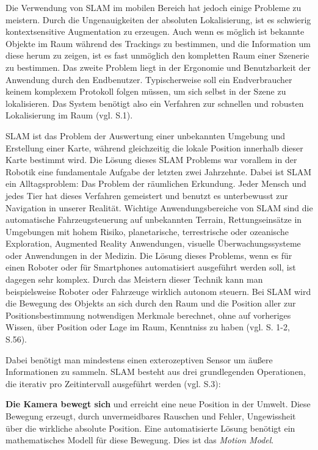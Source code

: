 Die Verwendung von SLAM im mobilen Bereich hat jedoch einige Probleme zu meistern. Durch die Ungenauigkeiten der absoluten Lokalisierung, ist es schwierig kontextsensitive Augmentation zu erzeugen. Auch wenn es möglich ist bekannte Objekte im Raum während des Trackings zu bestimmen, und die Information um diese herum zu zeigen, ist es fast unmöglich den kompletten Raum einer Szenerie zu bestimmen. Das zweite Problem liegt in der Ergonomie und Benutzbarkeit der Anwendung durch den Endbenutzer. Typischerweise soll ein Endverbraucher keinem komplexem Protokoll folgen müssen, um sich selbst in der Szene zu lokalisieren. Das System benötigt also ein Verfahren zur schnellen und robusten Lokalisierung im Raum (vgl. \cite{slam_mobile} S.1).

SLAM ist das Problem der Auswertung einer unbekannten Umgebung und Erstellung einer Karte, während gleichzeitig die lokale Position innerhalb dieser Karte bestimmt wird. Die Lösung dieses SLAM Problems war vorallem in der Robotik eine fundamentale Aufgabe der letzten zwei Jahrzehnte. Dabei ist SLAM ein Alltagsproblem: Das Problem der räumlichen Erkundung. Jeder Mensch und jedes Tier hat dieses Verfahren gemeistert und benutzt es unterbewusst zur Navigation in unserer Realität. Wichtige Anwendungsbereiche von SLAM sind die automatische Fahrzeugsteuerung auf unbekannten Terrain, Rettungseinsätze in Umgebungen mit hohem Risiko, planetarische, terrestrische oder ozeanische Exploration, Augmented Reality Anwendungen, visuelle Überwachungssysteme oder Anwendungen in der Medizin. Die Lösung dieses Problems, wenn es für einen Roboter oder für Smartphones automatisiert ausgeführt werden soll, ist dagegen sehr komplex. Durch das Meistern dieser Technik kann man beispielsweise Roboter oder Fahrzeuge wirklich autonom steuern. Bei SLAM wird die Bewegung des Objekts an sich durch den Raum und die Position aller zur Positionsbestimmung notwendigen Merkmale berechnet, ohne auf vorheriges Wissen, über Position oder Lage im Raum, Kenntniss zu haben (vgl. \cite{slam} S. 1-2, \cite{survey} S.56).

Dabei benötigt man mindestens einen exterozeptiven Sensor um äußere Informationen zu sammeln.
SLAM besteht aus drei grundlegenden Operationen, die iterativ pro Zeitintervall ausgeführt werden (vgl. \cite{ekf_slam} S.3):

\textbf{Die Kamera bewegt sich} und erreicht eine neue Position in der Umwelt. Diese Bewegung erzeugt, durch unvermeidbares Rauschen und Fehler, Ungewissheit über die wirkliche absolute Position. Eine automatisierte Lösung benötigt ein mathematisches Modell für diese Bewegung. Dies ist das \glqq\textit{Motion Model}\grqq{}.

